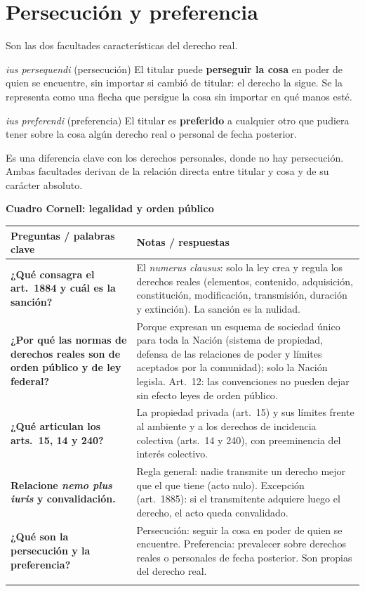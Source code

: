 \documentclass[12pt,oneside]{book}
\renewcommand{\arraystretch}{1.25}
\newcommand{\cq}[2]{\textbf{#1} & #2 \\[0.45em]}
\newcommand{\cornell}[3]{%
\par\bigskip\noindent\textbf{\large Cuadro Cornell: #1}\par\smallskip
\begin{center}
\small
\renewcommand{\arraystretch}{1.15}
\begin{tabularx}{\textwidth}{>{\raggedright\arraybackslash}p{0.27\textwidth}>{\raggedright\arraybackslash}X}
\toprule
\textbf{Preguntas / palabras clave} & \textbf{Notas / respuestas} \\
\midrule
#2
\midrule
\multicolumn{2}{p{\dimexpr\textwidth-2\tabcolsep\relax}}{\textbf{Resumen.} #3} \\
\bottomrule
\end{tabularx}
\end{center}
}
\begin{document}
\section{Persecución y preferencia}

Son las dos facultades características del derecho real.

\begin{definicion}{\textit{ius persequendi} (persecución)}
El titular puede \textbf{perseguir la cosa} en poder de quien se encuentre, sin importar si cambió de titular: el derecho la sigue. Se la representa como una flecha que persigue la cosa sin importar en qué manos esté.
\end{definicion}

\begin{definicion}{\textit{ius preferendi} (preferencia)}
El titular es \textbf{preferido} a cualquier otro que pudiera tener sobre la cosa algún derecho real o personal de fecha posterior.
\end{definicion}

Es una diferencia clave con los derechos personales, donde no hay persecución. Ambas facultades derivan de la relación directa entre titular y cosa y de su carácter absoluto.

\cornell{legalidad y orden público}{
\cq{¿Qué consagra el art.~1884 y cuál es la sanción?}{El \textit{numerus clausus}: solo la ley crea y regula los derechos reales (elementos, contenido, adquisición, constitución, modificación, transmisión, duración y extinción). La sanción es la nulidad.}
\cq{¿Por qué las normas de derechos reales son de orden público y de ley federal?}{Porque expresan un esquema de sociedad único para toda la Nación (sistema de propiedad, defensa de las relaciones de poder y límites aceptados por la comunidad); solo la Nación legisla. Art.~12: las convenciones no pueden dejar sin efecto leyes de orden público.}
\cq{¿Qué articulan los arts.~15, 14 y 240?}{La propiedad privada (art.~15) y sus límites frente al ambiente y a los derechos de incidencia colectiva (arts.~14 y 240), con preeminencia del interés colectivo.}
\cq{Relacione \textit{nemo plus iuris} y convalidación.}{Regla general: nadie transmite un derecho mejor que el que tiene (acto nulo). Excepción (art.~1885): si el transmitente adquiere luego el derecho, el acto queda convalidado.}
\cq{¿Qué son la persecución y la preferencia?}{Persecución: seguir la cosa en poder de quien se encuentre. Preferencia: prevalecer sobre derechos reales o personales de fecha posterior. Son propias del derecho real.}
}{Solo la ley federal crea y regula los derechos reales (\textit{numerus clausus}), bajo normas de orden público y con sanción de nulidad. Ese carácter responde a un esquema de sociedad único y a la preeminencia del interés colectivo. El \textit{nemo plus iuris} limita la transmisión; la convalidación la sana si el transmitente adquiere después el derecho. La persecución y la preferencia son las facultades características del derecho real.}
\end{document}
